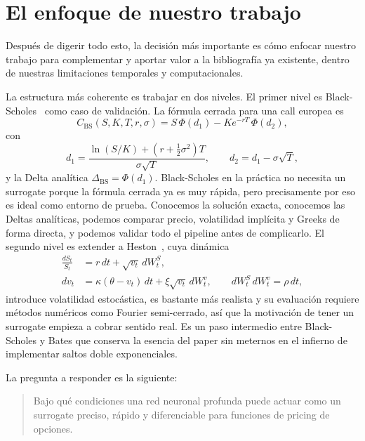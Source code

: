 \documentclass[11pt,a4paper]{article}
\begin{document}
\section{El enfoque de nuestro trabajo}

Después de digerir todo esto, la decisión más importante es cómo enfocar nuestro trabajo para complementar y aportar valor a la bibliografía ya existente, dentro de nuestras limitaciones temporales y computacionales.

La estructura más coherente es trabajar en dos niveles. El primer nivel es Black-Scholes~\cite{blackscholes1973} como caso de validación. La fórmula cerrada para una call europea es
\begin{equation}
C_{\mathrm{BS}}(S, K, T, r, \sigma) = S\, \Phi(d_1) - K e^{-rT}\, \Phi(d_2),
\end{equation}
con
\begin{equation}
d_1 = \frac{\ln(S/K) + (r + \tfrac{1}{2}\sigma^2)T}{\sigma\sqrt{T}}, \qquad d_2 = d_1 - \sigma\sqrt{T},
\end{equation}
y la Delta analítica $\Delta_{\mathrm{BS}} = \Phi(d_1)$. Black-Scholes en la práctica no necesita un surrogate porque la fórmula cerrada ya es muy rápida, pero precisamente por eso es ideal como entorno de prueba. Conocemos la solución exacta, conocemos las Deltas analíticas, podemos comparar precio, volatilidad implícita y Greeks de forma directa, y podemos validar todo el pipeline antes de complicarlo. El segundo nivel es extender a Heston~\cite{heston1993}, cuya dinámica
\begin{align}
\frac{dS_t}{S_t} &= r\, dt + \sqrt{v_t}\, dW^S_t, \\
dv_t &= \kappa(\theta - v_t)\, dt + \xi \sqrt{v_t}\, dW^v_t, \qquad dW^S_t\, dW^v_t = \rho\, dt,
\end{align}
introduce volatilidad estocástica, es bastante más realista y su evaluación requiere métodos numéricos como Fourier semi-cerrado, así que la motivación de tener un surrogate empieza a cobrar sentido real. Es un paso intermedio entre Black-Scholes y Bates que conserva la esencia del paper sin meternos en el infierno de implementar saltos doble exponenciales.

La pregunta a responder es la siguiente:

\begin{quote}
Bajo qué condiciones una red neuronal profunda puede actuar como un surrogate preciso, rápido y diferenciable para funciones de pricing de opciones.
\end{quote}
\end{document}
